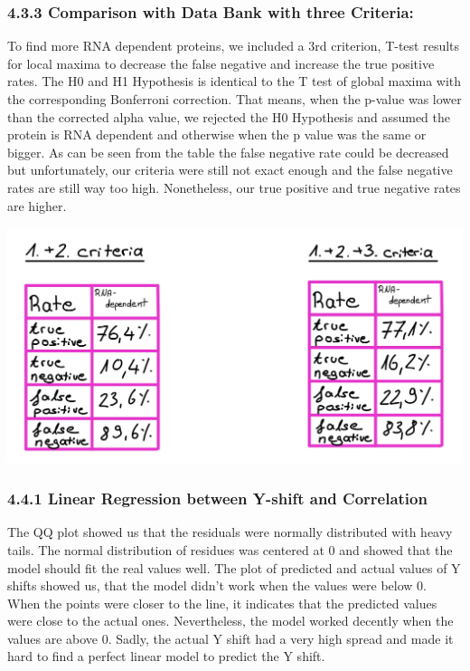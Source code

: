 \documentclass[
]{article}
\begin{document}
\hypertarget{comparison-with-data-bank-with-three-criteria-1}{%
\subsubsection{4.3.3 Comparison with Data Bank with three
Criteria:}\label{comparison-with-data-bank-with-three-criteria-1}}

To find more RNA dependent proteins, we included a 3rd criterion, T-test
results for local maxima to decrease the false negative and increase the
true positive rates. The H0 and H1 Hypothesis is identical to the T test
of global maxima with the corresponding Bonferroni correction. That
means, when the p-value was lower than the corrected alpha value, we
rejected the H0 Hypothesis and assumed the protein is RNA dependent and
otherwise when the p value was the same or bigger. As can be seen from
the table the false negative rate could be decreased but unfortunately,
our criteria were still not exact enough and the false negative rates
are still way too high. Nonetheless, our true positive and true negative
rates are higher.

\includegraphics{../results/png/TrueFalseRates.png}

\hypertarget{linear-regression-between-y-shift-and-correlation}{%
\subsubsection{4.4.1 Linear Regression between Y-shift and
Correlation}\label{linear-regression-between-y-shift-and-correlation}}

The QQ plot showed us that the residuals were normally distributed with
heavy tails. The normal distribution of residues was centered at 0 and
showed that the model should fit the real values well. The plot of
predicted and actual values of Y shifts showed us, that the model didn't
work when the values were below 0. When the points were closer to the
line, it indicates that the predicted values were close to the actual
ones. Nevertheless, the model worked decently when the values are above
0. Sadly, the actual Y shift had a very high spread and made it hard to
find a perfect linear model to predict the Y shift.
\end{document}

